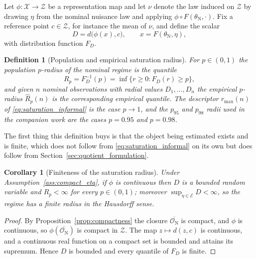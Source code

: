 \documentclass[a4paper]{cas-sc}
\newtheorem{definition}{Definition}
\newtheorem{corollary}{Corollary}
\newcommand{\X}{\ensuremath{\mathcal{X}}}
\newcommand{\Z}{\ensuremath{\mathcal{Z}}}
\newcommand{\EtaSpace}{\ensuremath{\mathcal{E}}}
\begin{document}
Let \(\phi:\X\to\Z\) be a representation map and let \(\nu\) denote the law
induced on \(\Z\) by drawing \(\eta\) from the nominal nuisance law and
applying \(\phi\circ F(\theta_{\mathrm N},\cdot)\). Fix a reference point
\(c\in\Z\), for instance the mean of \(\nu\), and define the scalar
\begin{equation}
D = d\bigl(\phi(x),c\bigr), \qquad x = F(\theta_{\mathrm N},\eta),
\label{eq:radial_variable}
\end{equation}
with distribution function \(F_D\).

\begin{definition}[Population and empirical saturation radius]
\label{def:saturation_radius}
For \(p\in(0,1)\) the \emph{population \(p\)-radius} of the nominal regime is
the quantile
\begin{equation}
R_p = F_D^{-1}(p) = \inf\{r\ge 0 : F_D(r)\ge p\},
\label{eq:population_radius}
\end{equation}
and given \(n\) nominal observations with radial values
\(D_1,\ldots,D_n\) the \emph{empirical \(p\)-radius} \(\widehat R_p(n)\) is the
corresponding empirical quantile. The descriptor \(r_{\max}(n)\) of
\eqref{eq:saturation_informal} is the case \(p\to 1\), and the \(p_{95}\) and
\(p_{98}\) radii used in the companion work are the cases \(p=0.95\) and
\(p=0.98\).
\end{definition}

The first thing this definition buys is that the object being estimated exists
and is finite, which does not follow from \eqref{eq:saturation_informal} on its
own but does follow from Section~\ref{sec:quotient_formulation}.

\begin{corollary}[Finiteness of the saturation radius]
\label{cor:finite_radius}
Under Assumption~\ref{ass:compact_eta}, if \(\phi\) is continuous then \(D\) is
a bounded random variable and \(R_p<\infty\) for every \(p\in(0,1)\); moreover
\(\sup_{\eta\in\EtaSpace} D<\infty\), so the regime has a finite radius in the
Hausdorff sense.
\end{corollary}

\begin{proof}
By Proposition~\ref{prop:compactness} the closure
\(\overline{\mathcal{O}_{\mathrm N}}\) is compact, and \(\phi\) is continuous,
so \(\phi(\overline{\mathcal{O}_{\mathrm N}})\) is compact in \(\Z\). The map
\(z\mapsto d(z,c)\) is continuous, and a continuous real function on a compact
set is bounded and attains its supremum. Hence \(D\) is bounded and every
quantile of \(F_D\) is finite.
\end{proof}
\end{document}
